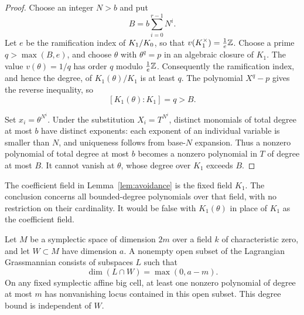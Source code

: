 \begin{proof}
Choose an integer $N>b$ and put
\[
 B=b\sum_{i=0}^{r-1}N^i.
\]
Let $e$ be the ramification index of $K_1/K_0$, so that
$v(K_1^\times)=\frac1e\mathbb Z$.  Choose a prime $q>\max(B,e)$, and choose
$\theta$ with $\theta^q=p$ in an algebraic closure of $K_1$.  The value
$v(\theta)=1/q$ has order $q$ modulo $\frac1e\mathbb Z$.  Consequently the
ramification index, and hence the degree, of $K_1(\theta)/K_1$ is at
least $q$.  The polynomial $X^q-p$ gives the reverse inequality, so
\[
 [K_1(\theta):K_1]=q>B.
\]

Set $x_i=\theta^{N^i}$.  Under the substitution $X_i=T^{N^i}$,
distinct monomials of total degree at most $b$ have distinct exponents:
each exponent of an individual variable is smaller than $N$, and
uniqueness follows from base-$N$ expansion.  Thus a nonzero polynomial
of total degree at most $b$ becomes a nonzero polynomial in $T$ of
degree at most $B$.  It cannot vanish at $\theta$, whose degree over
$K_1$ exceeds $B$.
\end{proof}

\begin{remark}
The coefficient field in Lemma~\ref{lem:avoidance} is the fixed field
$K_1$.  The conclusion concerns all bounded-degree polynomials over that
field, with no restriction on their cardinality.  It would be false with
$K_1(\theta)$ in place of $K_1$ as the coefficient field.
\end{remark}

\begin{lemma}
\label{lem:lagrangian-intersection}
Let $M$ be a symplectic space of dimension $2m$ over a field $k$ of
characteristic zero, and let $W\subset M$ have dimension $a$.  A nonempty
open subset of the Lagrangian Grassmannian consists of subspaces $L$
such that
\[
 \dim(L\cap W)=\max(0,a-m).
\]
On any fixed symplectic affine big cell, at least one nonzero polynomial
of degree at most $m$ has nonvanishing locus contained in this open
subset.  This degree bound is independent of $W$.
\end{lemma}

